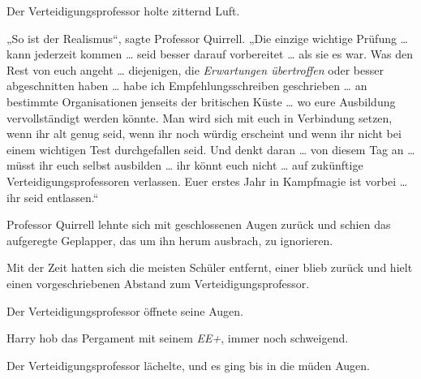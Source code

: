 Der Verteidigungsprofessor holte zitternd Luft.

„So ist der Realismus“, sagte Professor Quirrell.
„Die einzige wichtige Prüfung … kann jederzeit kommen … seid besser darauf vorbereitet … als sie es war. Was den Rest von euch angeht … diejenigen, die \emph{Erwartungen übertroffen} oder besser abgeschnitten haben … habe ich Empfehlungsschreiben geschrieben … an bestimmte Organisationen jenseits der britischen Küste … wo eure Ausbildung vervollständigt werden könnte. Man wird sich mit euch in Verbindung setzen, wenn ihr alt genug seid, wenn ihr noch würdig erscheint und wenn ihr nicht bei einem wichtigen Test durchgefallen seid. Und denkt daran … von diesem Tag an … müsst ihr euch selbst ausbilden … ihr könnt euch nicht … auf zukünftige Verteidigungsprofessoren verlassen. Euer erstes Jahr in Kampfmagie ist vorbei … ihr seid entlassen.“

Professor Quirrell lehnte sich mit geschlossenen Augen zurück und schien das aufgeregte Geplapper, das um ihn herum ausbrach, zu ignorieren.

Mit der Zeit hatten sich die meisten Schüler entfernt, einer blieb zurück und hielt einen vorgeschriebenen Abstand zum Verteidigungsprofessor.

Der Verteidigungsprofessor öffnete seine Augen.

Harry hob das Pergament mit seinem \emph{EE+}, immer noch schweigend.

Der Verteidigungsprofessor lächelte, und es ging bis in die müden Augen.

